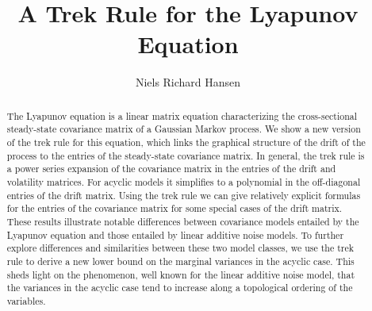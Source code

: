 \documentclass[10pt,twoside,a4paper]{amsart}
\begin{document}
\newtheorem{theorem}{Theorem}[section]
\newtheorem{proposition}[theorem]{Proposition}
\newtheorem{lemma}[theorem]{Lemma}
\newtheorem{definition}[theorem]{Definition}
\newtheorem{corollary}[theorem]{Corollary}

\theoremstyle{definition}
\newtheorem{ex}[theorem]{Example}
\newtheorem{rem}[theorem]{Remark}


\title[A Trek Rule for the Lyapunov Equation]{A Trek Rule for the Lyapunov Equation}

\author[N. R. Hansen]{Niels Richard Hansen}


\address{Department of Mathematical Sciences, University
of Copenhagen Universitetsparken 5, 2100 Copenhagen \O, Denmark,
Niels.R.Hansen@math.ku.dk}


    

\maketitle

\begin{abstract}

The Lyapunov equation is a linear matrix equation characterizing the cross-sectional steady-state covariance matrix of a Gaussian Markov process. We show a new version of the trek rule for this equation, which links the graphical structure of the drift of the process to the entries of the steady-state covariance matrix. In general, the trek rule is a power series expansion of the covariance matrix in the entries of the drift and volatility matrices. For acyclic models it simplifies to a polynomial in the off-diagonal entries of the drift matrix. Using the trek rule we can give relatively explicit formulas for the entries of the covariance matrix for some special cases of the drift matrix. These results illustrate notable differences between covariance models entailed by the Lyapunov equation and those entailed by linear additive noise models. To further explore differences and similarities between these two model classes, we use the trek rule to derive a new lower bound on the marginal variances in the acyclic case. This sheds light on the phenomenon, well known for the linear additive noise model, that the variances in the acyclic case tend to increase along a topological ordering of the variables.

\end{abstract}
    
\end{document}
